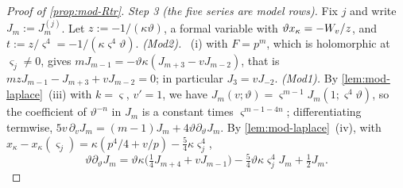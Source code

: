 \begin{proof}[Proof of \cref{prop:mod-Rtr}]
\emph{Step 3 (the five series are model rows).} Fix $j$ and write $J_m:=J^{(j)}_m$. Let $z:=-1/(\kappa\vartheta)$, a formal variable with $\vartheta x_\kappa=-W_{v}/z$, and $t:=z/\varsigma^4=-1/(\kappa\varsigma^4\vartheta)$. \emph{(Mod2).} ~(i) with $F=p^m$, which is holomorphic at $\varsigma_j\neq 0$, gives $mJ_{m-1}=-\vartheta\kappa(J_{m+3}-vJ_{m-2})$, that is $mzJ_{m-1}-J_{m+3}+vJ_{m-2}=0$; in particular $J_3=vJ_{-2}$. \emph{(Mod1).} By \cref{lem:mod-laplace}~(iii) with $k=\varsigma$, $v'=1$, we have $J_m(v;\vartheta)=\varsigma^{m-1}J_m(1;\varsigma^4\vartheta)$, so the coefficient of $\vartheta^{-n}$ in $J_m$ is a constant times $\varsigma^{m-1-4n}$; differentiating termwise, $5v\,\partial_vJ_m=(m-1)J_m+4\vartheta\partial_\vartheta J_m$. By \cref{lem:mod-laplace}~(iv), with $x_\kappa-x_\kappa(\varsigma_j)=\kappa(p^4/4+v/p)-\frac54\kappa\varsigma_j^4$,
\[
\vartheta\partial_\vartheta J_m=\vartheta\kappa\big(\tfrac14J_{m+4}+vJ_{m-1}\big)-\tfrac54\vartheta\kappa\varsigma_j^4J_m+\tfrac12J_m .
\]

\end{proof}

